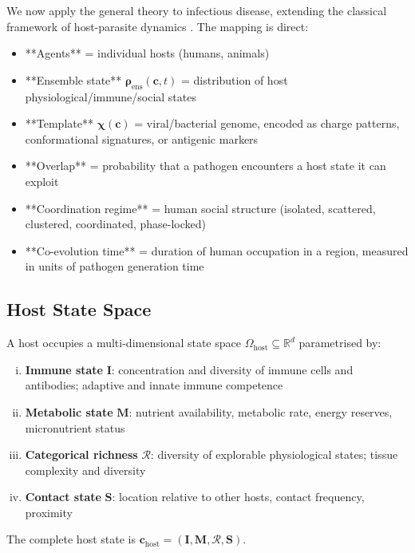 \documentclass[11pt,twocolumn,a4paper]{article}
\newcommand{\R}{\mathbb{R}}
\newcommand{\Template}{\boldsymbol{\chi}}
\newcommand{\State}{\boldsymbol{\rho}}
\begin{document}
We now apply the general theory to infectious disease, extending the classical framework of host-parasite dynamics \cite{anderson1979regulation,diekmann1990host}. The mapping is direct:
\begin{itemize}
\item **Agents** = individual hosts (humans, animals)
\item **Ensemble state** $\State_{\mathrm{ens}}(\mathbf{c}, t)$ = distribution of host physiological/immune/social states
\item **Template** $\Template(\mathbf{c})$ = viral/bacterial genome, encoded as charge patterns, conformational signatures, or antigenic markers
\item **Overlap** = probability that a pathogen encounters a host state it can exploit
\item **Coordination regime** = human social structure (isolated, scattered, clustered, coordinated, phase-locked)
\item **Co-evolution time** = duration of human occupation in a region, measured in units of pathogen generation time
\end{itemize}

\subsection{Host State Space}

\begin{definition}
A host occupies a multi-dimensional state space $\Omega_{\mathrm{host}} \subseteq \R^d$ parametrised by:
\begin{enumerate}[(i)]
\item \textbf{Immune state} $\mathbf{I}$: concentration and diversity of immune cells and antibodies; adaptive and innate immune competence
\item \textbf{Metabolic state} $\mathbf{M}$: nutrient availability, metabolic rate, energy reserves, micronutrient status
\item \textbf{Categorical richness} $\mathcal{R}$: diversity of explorable physiological states; tissue complexity and diversity
\item \textbf{Contact state} $\mathbf{S}$: location relative to other hosts, contact frequency, proximity
\end{enumerate}
The complete host state is $\mathbf{c}_{\mathrm{host}} = (\mathbf{I}, \mathbf{M}, \mathcal{R}, \mathbf{S})$.
\end{definition}
\end{document}
